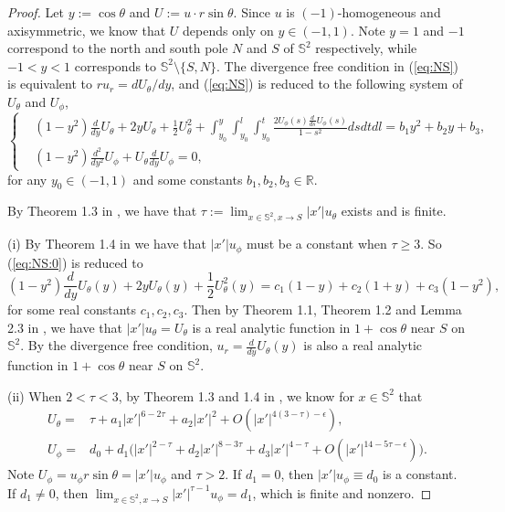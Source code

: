 \documentclass[12pt]{article}
\begin{document}
\begin{proof}
	Let $y:=\cos\theta$ and $U:= u\cdot r \sin\theta$. Since $u$ is $(-1)$-homogeneous and axisymmetric, we know that $U$ depends only on $y\in (-1, 1)$. Note $y=1$ and $-1$ correspond to the north and south pole $N$ and $S$ of $\mathbb{S}^2$ respectively, while $-1<y<1$ corresponds to $\mathbb{S}^2\setminus\{S,N\}$. The divergence free condition in (\ref{eq:NS}) is equivalent to $ru_r=dU_{\theta}/dy$, and (\ref{eq:NS}) is reduced to the following system of $U_{\theta}$ and $U_{\phi}$, 
	\begin{equation}\label{eq:NS:0}
		\left\{
		\begin{aligned}
			& (1-y^2) \frac{d}{dy}U_\theta + 2y U_\theta +\frac{1}{2} U_\theta^2 + \int_{y_0}^y \int_{y_0}^l \int_{y_0}^t \frac{2 U_\phi(s) \frac{d}{ds}U_\phi(s)}{1-s^2} ds dt dl = b_1 y^2 +b_2 y + b_3, \\
			& (1-y^2) \frac{d^2}{dy^2}U_\phi + U_\theta \frac{d}{dy}U_\phi = 0, 
		\end{aligned}
		\right. 
	\end{equation}
	for any $y_0\in (-1, 1)$ and some constants $b_1, b_2, b_3\in\mathbb{R}$. 
	
	By Theorem 1.3 in \cite{LLY1}, we have that $\tau:=\lim_{x\in\mathbb{S}^2, x\to S}|x'|u_{\theta}$ exists and is finite. 
	
	(i) By Theorem 1.4 in \cite{LLY1} we have that $|x'|u_{\phi}$ must be a constant when $\tau \ge 3$. So (\ref{eq:NS:0}) is reduced to 
	\begin{equation}\label{eq:NS:1}
		(1-y^2)\frac{d}{dy}U_{\theta}(y)+2yU_{\theta}(y)+\frac{1}{2}U^2_{\theta}(y)=c_1(1-y)+c_2(1+y)+c_3(1-y^2), 
	\end{equation}
	for some real constants $c_1, c_2, c_3$. Then by Theorem 1.1, Theorem 1.2 and Lemma 2.3 in \cite{LLY2}, we have that $|x'|u_{\theta}=U_{\theta}$ is a real analytic function in $1+\cos\theta$ near $S$ on $\mathbb{S}^2$. By the divergence free condition, $u_r=\frac{d}{dy}U_{\theta}(y)$ is also a real analytic function in $1+\cos\theta$ near $S$ on $\mathbb{S}^2$.
	
	(ii) When $2<\tau<3$, by Theorem 1.3 and 1.4 in \cite{LLY1}, we know for $x\in \mathbb{S}^2$ that 
	\begin{align}
		U_\theta = & \tau + a_1 |x'|^{6-2\tau} + a_2 |x'|^2 + O(|x'|^{4(3-\tau)-\epsilon}), \label{eq:Uth:2} \\
		U_\phi = & d_0 + d_1 \big( |x'|^{2-\tau} + d_2 |x'|^{8-3\tau} + d_3 |x'|^{4-\tau} + O(|x'|^{14-5\tau-\epsilon}) \big). \label{eq:Uph:2}
	\end{align}
	Note $U_{\phi}=u_{\phi}r\sin\theta=|x'|u_{\phi}$ and $\tau>2$. If $d_1=0$, then $|x'|u_\phi \equiv d_0$ is a constant. If $d_1\ne 0$, then $\lim_{x\in\mathbb{S}^2,x\to S} |x'|^{\tau-1} u_\phi=d_1$, which is finite and nonzero. 		
	

\end{proof}
\end{document}
